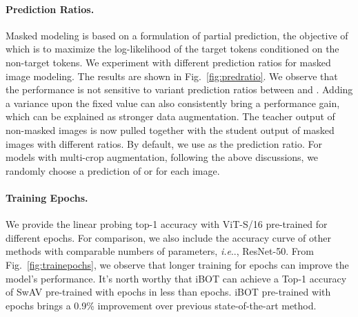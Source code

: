 \documentclass{article} \usepackage{iclr2022_conference,times}
\makeatletter
\def\ourmethod{{iBOT}\xspace}
\DeclareRobustCommand\onedot{\futurelet\@let@token\@onedot}
\def\@onedot{\ifx\@let@token.\else.\null\fi\xspace}
\def\ie{\emph{i.e}\onedot} \def\Ie{\emph{I.e}\onedot}
\makeatother
\begin{document}
\paragraph{Prediction Ratios.}
Masked modeling is based on a formulation of partial prediction, the objective of which is to maximize the log-likelihood of the target tokens conditioned on the non-target tokens. We experiment with different prediction ratios for masked image modeling. The results are shown in Fig.~\ref{fig:predratio}. We observe that the performance is not sensitive to variant prediction ratios between  and . Adding a variance upon the fixed value can also consistently bring a performance gain, which can be explained as stronger data augmentation. The teacher output of non-masked images is now pulled together with the student output of masked images with different ratios. By default, we use  as the prediction ratio. For models with multi-crop augmentation, following the above discussions, we randomly choose a prediction of  or  for each image.

\paragraph{Training Epochs.} 
We provide the linear probing top-1 accuracy with ViT-S/16 pre-trained for different epochs. For comparison, we also include the accuracy curve of other methods with comparable numbers of parameters, \ie, ResNet-50. From Fig.~\ref{fig:trainepochs}, we observe that longer training for  epochs can improve the model's performance. It's north worthy that \ourmethod can achieve a Top-1 accuracy of SwAV \citep{swav} pre-trained with  epochs in less than  epochs. \ourmethod pre-trained with  epochs brings a 0.9\% improvement over previous state-of-the-art method.
\end{document}
